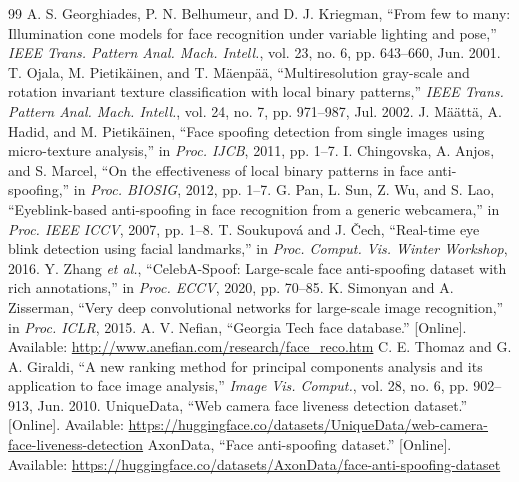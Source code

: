 \documentclass[conference,a4paper]{IEEEtran}
\begin{document}
\begin{thebibliography}{99}
 A. S. Georghiades, P. N. Belhumeur, and D. J. Kriegman, ``From few to many: Illumination cone models for face recognition under variable lighting and pose,'' \emph{IEEE Trans. Pattern Anal. Mach. Intell.}, vol. 23, no. 6, pp. 643--660, Jun. 2001.
 T. Ojala, M. Pietik\"ainen, and T. M\"aenp\"a\"a, ``Multiresolution gray-scale and rotation invariant texture classification with local binary patterns,'' \emph{IEEE Trans. Pattern Anal. Mach. Intell.}, vol. 24, no. 7, pp. 971--987, Jul. 2002.
 J. M\"a\"att\"a, A. Hadid, and M. Pietik\"ainen, ``Face spoofing detection from single images using micro-texture analysis,'' in \emph{Proc. IJCB}, 2011, pp. 1--7.
 I. Chingovska, A. Anjos, and S. Marcel, ``On the effectiveness of local binary patterns in face anti-spoofing,'' in \emph{Proc. BIOSIG}, 2012, pp. 1--7.
 G. Pan, L. Sun, Z. Wu, and S. Lao, ``Eyeblink-based anti-spoofing in face recognition from a generic webcamera,'' in \emph{Proc. IEEE ICCV}, 2007, pp. 1--8.
 T. Soukupov\'a and J. \v{C}ech, ``Real-time eye blink detection using facial landmarks,'' in \emph{Proc. Comput. Vis. Winter Workshop}, 2016.
 Y. Zhang \emph{et al.}, ``CelebA-Spoof: Large-scale face anti-spoofing dataset with rich annotations,'' in \emph{Proc. ECCV}, 2020, pp. 70--85.
 K. Simonyan and A. Zisserman, ``Very deep convolutional networks for large-scale image recognition,'' in \emph{Proc. ICLR}, 2015.
 A. V. Nefian, ``Georgia Tech face database.'' [Online]. Available: \url{http://www.anefian.com/research/face_reco.htm}
 C. E. Thomaz and G. A. Giraldi, ``A new ranking method for principal components analysis and its application to face image analysis,'' \emph{Image Vis. Comput.}, vol. 28, no. 6, pp. 902--913, Jun. 2010.
 UniqueData, ``Web camera face liveness detection dataset.'' [Online]. Available: \url{https://huggingface.co/datasets/UniqueData/web-camera-face-liveness-detection}
 AxonData, ``Face anti-spoofing dataset.'' [Online]. Available: \url{https://huggingface.co/datasets/AxonData/face-anti-spoofing-dataset}
\end{thebibliography}
\end{document}

